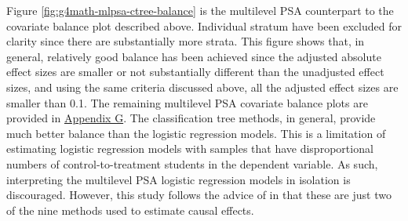 \documentclass[letterpaper,12pt]{article} %
\begin{document}
Figure \ref{fig:g4math-mlpsa-ctree-balance} is the multilevel PSA counterpart to the covariate balance plot described above. Individual stratum have been excluded for clarity since there are substantially more strata. This figure shows that, in general, relatively good balance has been achieved since the adjusted absolute effect sizes are smaller or not substantially different than the unadjusted effect sizes, and using the same criteria discussed above, all the adjusted effect sizes are smaller than 0.1. The remaining multilevel PSA covariate balance plots are provided in \hyperref[appendixG]{Appendix G}. The classification tree methods, in general, provide much better balance than the logistic regression models. This is a limitation of estimating logistic regression models with samples that have disproportional numbers of control-to-treatment students in the dependent variable. As such, interpreting the multilevel PSA logistic regression models in isolation is discouraged. However, this study follows the advice of  in that these are just two of the nine methods used to estimate causal effects.
\end{document}
